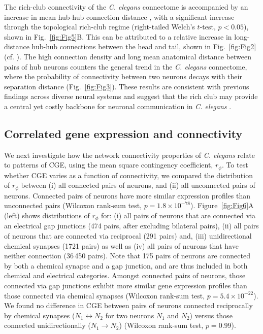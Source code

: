 \documentclass[10pt,letterpaper]{article}
\begin{document}
The rich-club connectivity of the \emph{C. elegans} connectome is accompanied by an increase in mean hub-hub connection distance \cite{Towlson2013}, with a significant increase through the topological rich-club regime (right-tailed Welch's $t$-test, $p < 0.05$), shown in Fig.~\ref{fig:Fig5}B.
This can be attributed to a relative increase in long-distance hub-hub connections between the head and tail, shown in Fig.~\ref{fig:Fig2} (cf. ).
The high connection density and long mean anatomical distance between pairs of hub neurons counters the general trend in the \emph{C. elegans} connectome, where the probability of connectivity between two neurons decays with their separation distance (Fig.~\ref{fig:Fig3}).
These results are consistent with previous findings across diverse neural systems and suggest that the rich club may provide a central yet costly backbone for neuronal communication in \emph{C. elegans} \cite{vandenHeuvel:2012kh, Towlson2013}.

\subsection*{Correlated gene expression and connectivity}

We next investigate how the network connectivity properties of \emph{C. elegans} relate to patterns of CGE, using the mean square contingency coefficient, $r_\phi$.
To test whether CGE varies as a function of connectivity, we compared the distribution of $r_\phi$ between
(i) all connected pairs of neurons, and
(ii) all unconnected pairs of neurons.
Connected pairs of neurons have more similar expression profiles than unconnected pairs (Wilcoxon rank-sum test, $p = 1.8 \times 10^{-78}$).
Figure~\ref{fig:Fig6}A (left) shows distributions of $r_\phi$ for:
(i) all pairs of neurons that are connected via an electrical gap junctions (474 pairs, after excluding bilateral pairs),
(ii) all pairs of neurons that are connected via reciprocal (291 pairs) and,
(iii) unidirectional chemical synapses (1721 pairs) as well as
(iv) all pairs of neurons that have neither connection (36\,450 pairs).
Note that 175 pairs of neurons are connected by both a chemical synapse and a gap junction, and are thus included in both chemical and electrical categories.
Amongst connected pairs of neurons, those connected via gap junctions exhibit more similar gene expression profiles than those connected via chemical synapses (Wilcoxon rank-sum test, $p = 5.4 \times 10^{-22}$).
We found no difference in CGE between pairs of neurons connected reciprocally by chemical synapses ($N_1 \leftrightarrow N_2$ for two neurons $N_1$ and $N_2$) versus those connected unidirectionally ($N_1 \rightarrow N_2$) (Wilcoxon rank-sum test, $p = 0.99$).
\end{document}
